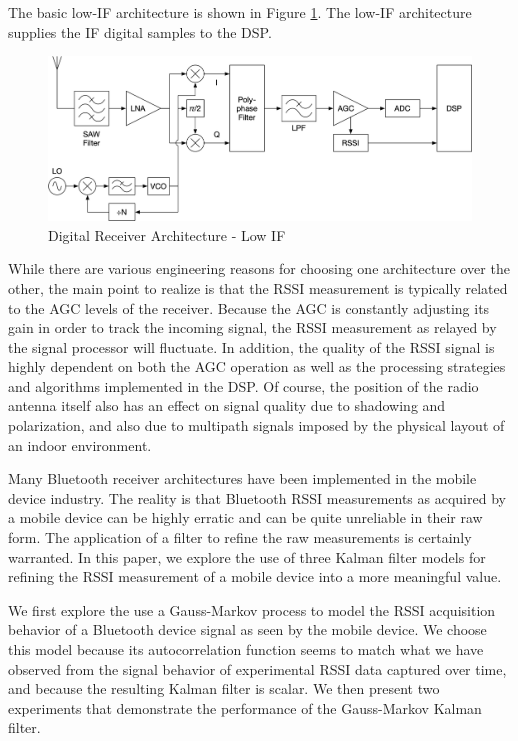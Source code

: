 \documentclass[12pt]{article}
\begin{document}
The basic low-IF architecture is shown in Figure \ref{fig:rx-arch-low-if}. The low-IF
architecture supplies the IF digital samples to the DSP.

\begin{figure}[ht]
    \centering
    \includegraphics[width=1.0\textwidth]{RX-Arch-Low-IF.png}
    \caption{Digital Receiver Architecture - Low IF}
    \label{fig:rx-arch-low-if}
\end{figure}

While there are various engineering reasons for choosing one architecture over the other,
the main point to realize is that the RSSI measurement is typically related to the AGC
levels of the receiver. Because the AGC is constantly adjusting its gain in order to
track the incoming signal, the RSSI measurement as relayed by the signal processor will
fluctuate. In addition, the quality of the RSSI signal is highly dependent on both the
AGC operation as well as the processing strategies and algorithms implemented in the DSP.
Of course, the position of the radio antenna itself also has an effect on signal quality
due to shadowing and polarization, and also due to multipath signals imposed by the
physical layout of an indoor environment.

Many Bluetooth receiver architectures have been implemented in the mobile device industry.
The reality is that Bluetooth RSSI measurements as acquired by a mobile device can be
highly erratic and can be quite unreliable in their raw form. The application of a filter
to refine the raw measurements is certainly warranted. In this paper, we explore the use
of three Kalman filter models for refining the RSSI measurement of a mobile device into
a more meaningful value.

We first explore the use a Gauss-Markov process to model the RSSI acquisition behavior of
a Bluetooth device signal as seen by the mobile device. We choose this model because its
autocorrelation function seems to match what we have observed from the signal behavior of
experimental RSSI data captured over time, and because the resulting Kalman filter is
scalar. We then present two experiments that demonstrate the performance of the
Gauss-Markov Kalman filter.
\end{document}
